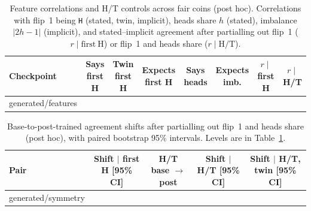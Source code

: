 \documentclass[11pt]{article}
\makeatletter
\newcommand*{\rows}[1]{\@@input #1 }
\makeatother
\begin{document}
\begin{table}[H]
\centering
\footnotesize
\caption{Feature correlations and H/T controls across fair coins (post hoc). Correlations with flip~1 being \texttt{H} (stated, twin, implicit), heads share $h$ (stated), imbalance $|2h - 1|$ (implicit), and stated--implicit agreement after partialling out flip~1 ($r \mid \mathrm{first\ H}$) or flip~1 and heads share ($r \mid \mathrm{H/T}$).}
\label{tab:features}
\setlength{\tabcolsep}{4pt}
\begin{tabular}{@{}lccccccc@{}}
\toprule
Checkpoint & \makecell{Says\\first H} & \makecell{Twin\\first H} & \makecell{Expects\\first H} & \makecell{Says\\heads} & \makecell{Expects\\imb.} & \makecell{$r \mid$\\first H} & \makecell{$r \mid$\\H/T} \\
\midrule
\rows{generated/features}
\bottomrule
\end{tabular}
\end{table}

\begin{table}[H]
\centering
\footnotesize
\caption{Base-to-post-trained agreement shifts after partialling out flip~1 and heads share (post hoc), with paired bootstrap 95\% intervals. Levels are in Table~\ref{tab:features}.}
\label{tab:symmetry}
\setlength{\tabcolsep}{4pt}
\begin{tabular}{@{}lcccc@{}}
\toprule
Pair & \makecell{Shift $\mid$ first H\\{[95\% CI]}} & \makecell{H/T\\base $\to$ post} & \makecell{Shift $\mid$ H/T\\{[95\% CI]}} & \makecell{Shift $\mid$ H/T, twin\\{[95\% CI]}} \\
\midrule
\rows{generated/symmetry}
\bottomrule
\end{tabular}
\end{table}
\end{document}
